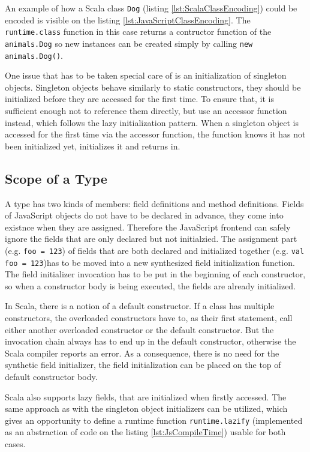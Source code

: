 \documentclass[12pt,a4paper]{report}
\begin{document}
An example of how a Scala class \texttt{Dog} (listing \ref{lst:ScalaClassEncoding}) could be encoded is visible on the listing \ref{lst:JavaScriptClassEncoding}. The \texttt{runtime.class} function in this case returns a contructor function of the \texttt{animals.Dog} so new instances can be created simply by calling \texttt{new animals.Dog()}.

One issue that has to be taken special care of is an initialization of singleton objects. Singleton objects behave similarly to static constructors, they should be initialized before they are accessed for the first time. To ensure that, it is sufficient enough not to reference them directly, but use an accessor function instead, which follows the lazy initialization pattern\cite{Lazy}. When a singleton object is accessed for the first time via the accessor function, the function knows it has not been initialized yet, initializes it and returns in.

\subsection{Scope of a Type}

A type has two kinds of members: field definitions and method definitions. Fields of JavaScript objects do not have to be declared in advance, they come into existnce when they are assigned. Therefore the JavaScript frontend can safely ignore the fields that are only declared but not initialzied. The assignment part (e.g. \texttt{foo = 123}) of fields that are both declared and initialized together (e.g. \texttt{val foo = 123})has to be moved into a new synthesized field initialization function. The field initializer invocation has to be put in the beginning of each constructor, so when a constructor body is being executed, the fields are already initialized.

In Scala, there is a notion of a default constructor. If a class has multiple constructors, the overloaded constructors have to, as their first statement, call either another overloaded constructor or the default constructor. But the invocation chain always has to end up in the default constructor, otherwise the Scala compiler reports an error. As a consequence, there is no need for the synthetic field initializer, the field initialization can be placed on the top of default constructor body.

Scala also supports lazy fields, that are initialized when firstly accessed. The same approach as with the singleton object initializers can be utilized, which gives an opportunity to define a runtime function \texttt{runtime.lazify} (implemented as an abstraction of code on the listing \ref{lst:JsCompileTime}) usable for both cases.
\end{document}
